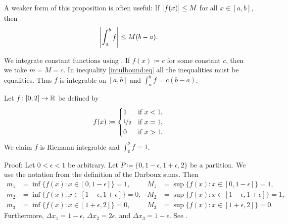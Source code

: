 A weaker form of this proposition is often useful:
If $\bigl\lvert {f(x)} \bigr\rvert \leq M$ for all $x \in [a,b]$, then
\begin{equation*}
\left\lvert {\int_a^b f} \right\rvert \leq M(b-a) .
\end{equation*}

\begin{example}
We integrate constant functions using
.
If $f(x) \coloneqq c$ for some constant $c$, then we take $m = M = c$.
In inequality \eqref{intulbound:eq}
all the inequalities must be equalities.
Thus $f$ is integrable on $[a,b]$ and $\int_a^b f = c(b-a)$.
\end{example}

\begin{example}
Let $f \colon [0,2] \to {\mathbb{R}}$ be defined by
\begin{equation*}
f(x) \coloneqq
\begin{cases}
1               & \text{if } x < 1,\\
\nicefrac{1}{2} & \text{if } x = 1,\\
0               & \text{if } x > 1.
\end{cases}
\end{equation*}
We claim $f$ is Riemann integrable and $\int_0^2 f = 1$.

Proof: Let $0 < \epsilon < 1$ be arbitrary.
Let $P \coloneqq \{0, 1-\epsilon, 1+\epsilon, 2\}$ be a partition.  We use the notation from
the definition of the Darboux sums.  Then
\begin{align*}
m_1 &= \inf  \bigl\{ f(x) : x \in [0,1-\epsilon] \bigr\} = 1 , & 
M_1 &= \sup  \bigl\{ f(x) : x \in [0,1-\epsilon] \bigr\} = 1 , \\
m_2 &= \inf  \bigl\{ f(x) : x \in [1-\epsilon,1+\epsilon] \bigr\} = 0 , & 
M_2 &= \sup  \bigl\{ f(x) : x \in [1-\epsilon,1+\epsilon] \bigr\} = 1 , \\
m_3 &= \inf  \bigl\{ f(x) : x \in [1+\epsilon,2] \bigr\} = 0 , & 
M_3 &= \sup  \bigl\{ f(x) : x \in [1+\epsilon,2] \bigr\} = 0 .
\end{align*}
Furthermore, $\Delta x_1 = 1-\epsilon$, $\Delta x_2 = 2\epsilon$, and
$\Delta x_3 = 1-\epsilon$.
See .
\begin{myfigureht}
\caption{Darboux sums for the step function.  $L(P,f)$ is the area of the
shaded rectangle, $U(P,f)$ is the area of both rectangles, and
$U(P,f)-L(P,f)$ is the area of the unshaded rectangle.\label{darbouxfigstep}}
\end{myfigureht}


\end{example}

